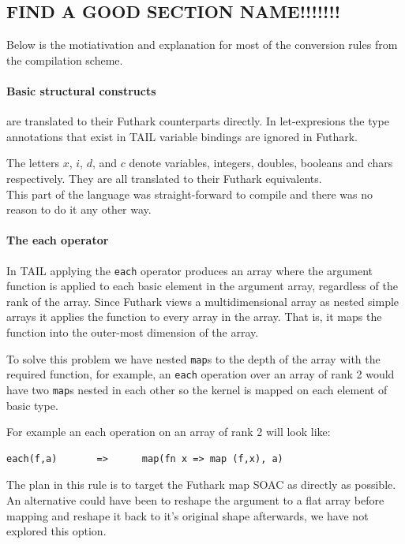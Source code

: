 \documentclass[11pt]{article}
\begin{document}
\subsection{FIND A GOOD SECTION NAME!!!!!!!}
Below is the motiativation and explanation for most of the conversion rules from the compilation scheme. 

\paragraph{Basic structural constructs} are translated to their Futhark counterparts directly.
In let-expresions the type annotations that exist in TAIL variable bindings are ignored in Futhark. 

The letters $x$, $i$, $d$, and $c$ denote variables, integers, doubles, booleans and chars respectively.
They are all translated to their Futhark equivalents.\\

This part of the language was straight-forward to compile and there was no reason to do it any other way.

\paragraph{The each operator} 

In TAIL applying the {\tt each} operator produces an array where the argument function is applied to each basic element in the
argument array, regardless of the rank of the array.
Since Futhark views a multidimensional array as nested simple arrays it applies the function to every array in the array.
That is, it maps the function into the outer-most dimension of the array\cite{TroelsHenriksen}.
 
To solve this problem we have nested {\tt map}s to the depth of the array with the required function,
for example, an {\tt each} operation over an array of rank 2 would have two {\tt map}s nested in each other so the kernel is
mapped on each element of basic type.
 
For example an each operation on an array of rank 2 will look like:
\begin{lstlisting}[numbers=none,frame=none]
each(f,a)       =>      map(fn x => map (f,x), a)
\end{lstlisting}

The plan in this rule is to target the Futhark map SOAC as directly as possible. An alternative could have been to reshape the
argument to a flat array before mapping and reshape it back to it's original shape afterwards, we have not explored this option.
\end{document}
